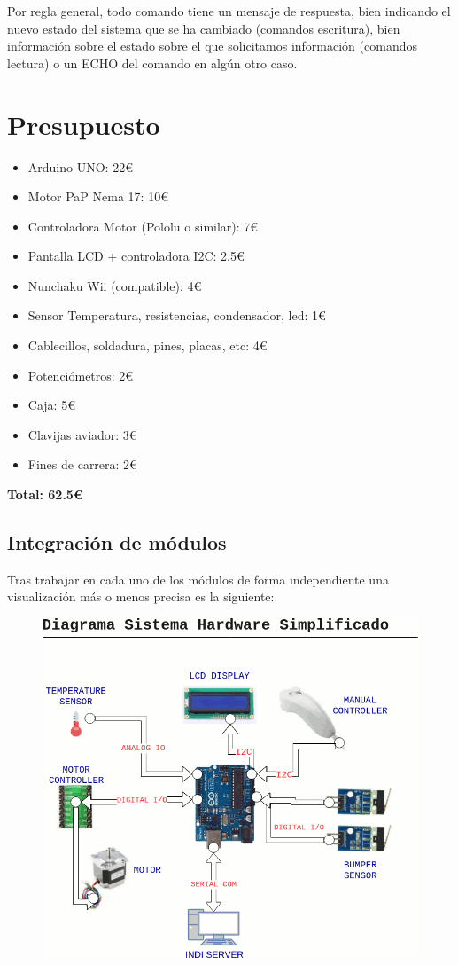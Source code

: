 Por regla general, todo comando tiene un mensaje de respuesta, bien indicando el nuevo estado del sistema que se ha cambiado (comandos escritura), bien información sobre el estado sobre el que solicitamos información (comandos lectura) o un ECHO del comando en algún otro caso.

\newpage


\section{Presupuesto}

\begin{itemize}
	\item Arduino UNO: 22\euro
	\item Motor PaP Nema 17: 10\euro
	\item Controladora Motor (Pololu o similar): 7\euro
	\item Pantalla LCD + controladora I2C: 2.5\euro
	\item Nunchaku Wii (compatible): 4\euro
	\item Sensor Temperatura, resistencias, condensador, led: 1\euro
	\item Cablecillos, soldadura, pines, placas, etc: 4\euro
	\item Potenciómetros: 2\euro
	\item Caja: 5\euro
	\item Clavijas aviador: 3\euro
	\item Fines de carrera: 2\euro
	
	
\end{itemize}
\textbf{Total: 62.5\euro}

\subsection{Integración de módulos}
\bigskip
Tras trabajar en cada uno de los módulos de forma independiente una visualización más o menos precisa es la siguiente:

\begin{figure}[h]
	\centering
	\includegraphics[width=0.9\linewidth]{../images/diagramaHardware}
	\caption{}
	\label{fig:diagramaHardware}
\end{figure}

